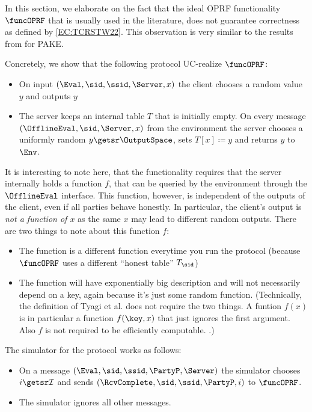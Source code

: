 
In this section, we elaborate on the fact that the ideal OPRF functionality $\funcOPRF$ that is usually used in the literature,
does not guarantee correctness as defined by \cref{EC:TCRSTW22}. 
This observation is very similar to the results from \cite{PKC:Roy22} for PAKE.

Concretely, we show that the following protocol UC-realize $\funcOPRF$:
\begin{itemize}
    \item On input $(\Eval,\sid,\ssid,\Server,x)$ the client chooses a random value $y$ and outputs $y$
    \item The server keeps an internal table $T$ that is initially empty. On every message $(\OfflineEval,\sid,\Server,x)$ from the environment the server chooses a uniformly random $y\getsr\OutputSpace$, sets $T[x]\coloneqq y$ and returns $y$ to $\Env$.
\end{itemize}
It is interesting to note here, that the functionality requires that the server internally holds a function $f$, that can be queried by the environment through the $\OfflineEval$ interface.
This function, however, is independent of the outputs of the client, even if all parties behave honestly. In particular, the client's output is \emph{not a function of $x$} as the same $x$ may lead to different random outputs.
There are two things to note about this function $f$:
\begin{itemize}
    \item The function is a different function everytime you run the protocol (because $\funcOPRF$ uses a different \enquote{honest table} $T_\sid$)
    \item The function will have exponentially big description and will not necessarily depend on a key, again because it's just some random function. (Technically, the definition of Tyagi et al. does not require the two things. A funtion $f(x)$ is in particular a function $f(\key,x)$ that just ignores the first argument. Also $f$ is not required to be efficiently computable. .)
\end{itemize}

The simulator for the protocol works as follows:
\begin{itemize}
    \item On a message $(\Eval,\sid,\ssid,\PartyP, \Server)$ the simulator chooses $i\getsr\mathcal{I}$ and sends $(\RcvComplete,\sid,\ssid,\PartyP,i)$ to $\funcOPRF$.
    \item The simulator ignores all other messages.
\end{itemize}


